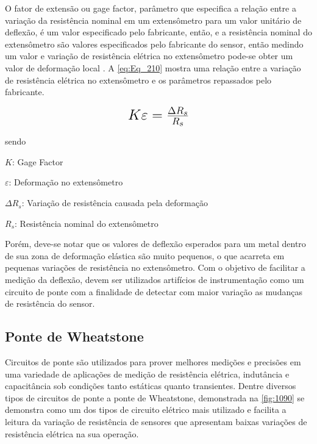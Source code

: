 O fator de extensão ou gage factor, parâmetro que especifica a relação entre a variação da resistência nominal em um extensômetro para um valor unitário
de deflexão, é um valor especificado pelo fabricante, então, e a resistência nominal do extensômetro são valores especificados pelo fabricante do sensor, então medindo um valor
e variação de resistência elétrica no extensômetro pode-se obter um valor de deformação local \autocite{Hollman2011}. A \autoref{eq:Eq_210} mostra uma relação entre a variação
de resistência elétrica no extensômetro e os parâmetros repassados pelo fabricante.

\begin{equation}\label{eq:Eq_210}%
\mbox{\fontsize{17.28}{21.6}\selectfont\( %
K \varepsilon = \frac{\Delta R_s }{R_s}
\)} %
\end{equation}

sendo

$K$: Gage Factor

$\varepsilon$: Deformação no extensômetro

$\Delta R_s$: Variação de resistência causada pela deformação

$R_s$: Resistência nominal do extensômetro

\hfill

Porém, deve-se notar que os valores de deflexão esperados para um metal dentro de sua zona de deformação elástica são muito pequenos, o que acarreta em pequenas
variações de resistência no extensômetro. Com o objetivo de facilitar a medição da deflexão, devem ser utilizados artifícios de instrumentação como um circuito de ponte
com a finalidade de detectar com maior variação as mudanças de resistência do sensor.

\subsection{Ponte de Wheatstone}

Circuitos de ponte são utilizados para prover melhores medições e precisões em uma variedade de aplicações de medição de resistência elétrica, indutância e capacitância
sob condições tanto estáticas quanto transientes. Dentre diversos tipos de circuitos de ponte a ponte de Wheatstone, demonstrada na \autoref{fig:1090} se
demonstra como um dos tipos de circuito elétrico mais utilizado e facilita a leitura da variação de resistência de sensores que apresentam baixas variações de resistência
elétrica na sua operação. \autocite{Hollman2011}

